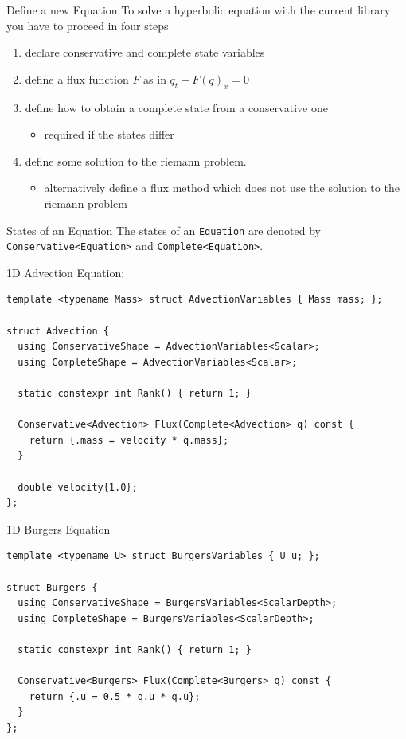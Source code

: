 \documentclass[ucs,9pt]{beamer}
\begin{document}
\begin{frame}{Define a new Equation}
To solve a hyperbolic equation with the current library you have to proceed in four steps

\vspace{0.3cm}
\begin{enumerate}
	\item declare conservative and complete state variables
	\item define a flux function $F$ as in $q_t + F(q)_x = 0$
	\item define how to obtain a complete state from a conservative one
	\begin{itemize} \item required if the states differ \end{itemize}
	\item define some solution to the riemann problem.
	\begin{itemize} \item alternatively define a flux method which does not use the solution to the riemann problem \end{itemize}
\end{enumerate}
\end{frame}

\begin{frame}[fragile]{States of an Equation}
The states of an \texttt{Equation} are denoted by \texttt{Conservative<Equation>} and \texttt{Complete<Equation>}.

\vspace{0.5cm}
1D Advection Equation:
\begin{lstlisting}
template <typename Mass> struct AdvectionVariables { Mass mass; };

struct Advection {
  using ConservativeShape = AdvectionVariables<Scalar>;
  using CompleteShape = AdvectionVariables<Scalar>;

  static constexpr int Rank() { return 1; }

  Conservative<Advection> Flux(Complete<Advection> q) const {
    return {.mass = velocity * q.mass};
  }

  double velocity{1.0};
};
\end{lstlisting}
\end{frame}

\begin{frame}[fragile]{1D Burgers Equation}
\begin{lstlisting}
template <typename U> struct BurgersVariables { U u; };

struct Burgers {
  using ConservativeShape = BurgersVariables<ScalarDepth>;
  using CompleteShape = BurgersVariables<ScalarDepth>;

  static constexpr int Rank() { return 1; }

  Conservative<Burgers> Flux(Complete<Burgers> q) const {
    return {.u = 0.5 * q.u * q.u};
  }
};
\end{lstlisting}
\end{frame}
\end{document}
